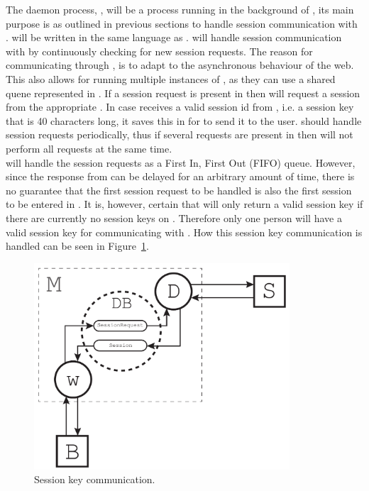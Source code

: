 The daemon process, , will be a process running in the background of , its main purpose is as outlined in previous sections to handle session communication with .
 will be written in the same language as . %
 will handle session communication with  by continuously checking  for new session requests.
The reason for communicating through , is to adapt to the asynchronous behaviour of the web.
This also allows for running multiple instances of , as they can use a shared quene represented in .
If a session request is present in  then  will request a session from the appropriate .
In case  receives a valid session id from , i.e. a session key that is 40 characters long, it saves this in  for  to send it to the user.
 should handle session requests periodically, thus if several requests are present in  then  will not perform all requests at the same time. \\

 will handle the session requests as a First In, First Out (FIFO) queue.
However, since the response from  can be delayed for an arbitrary amount of time, there is no guarantee that the first session request to be handled is also the first session to be entered in .
It is, however, certain that  will only return a valid session key if there are currently no session keys on .
Therefore only one person will have a valid session key for communicating with .
How this session key communication is handled can be seen in Figure~\ref{fig:sessionkey_communication_b}.

\begin{figure}[htb]
    \centering
    \includegraphics[width=0.85\textwidth]{gfx/sessionkey_communication_b.pdf}
    \caption{Session key communication.}
    \label{fig:sessionkey_communication_b}
\end{figure}

